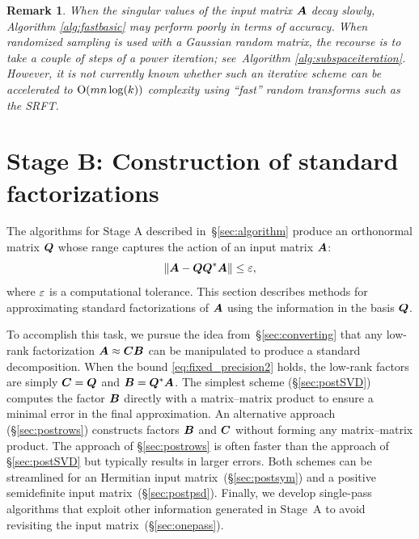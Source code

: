 \documentclass[final]{siamltex}
\newcounter{algorithm}[section]
\newtheorem{remark}{Remark}[section]
\begin{document}
\lsp

\begin{remark} \rm
When the singular values of the input matrix $\bm{A}$ decay slowly,
Algorithm \ref{alg:fastbasic} may perform poorly in terms of accuracy.
When randomized sampling is used with a Gaussian random matrix, the
recourse is to take a couple of steps of a power iteration;
see~Algorithm \ref{alg:subspaceiteration}. However, it is not currently
known whether such an iterative scheme can be accelerated to $\mathrm{O}(mn\log(k))$
complexity using ``fast'' random transforms such as the SRFT.
\end{remark}

\lsp

\section{Stage B: Construction of standard factorizations}
\label{sec:otherfactorizations}

The algorithms for Stage A described in~\S\ref{sec:algorithm} produce an
orthonormal matrix $\bm{Q}$ whose range captures the action of an input
matrix $\bm{A}$:
\begin{equation}
\label{eq:fixed_precision2}
%
\norm{\mtx{A} - \mtx{Q}\mtx{Q}^{\adj}\mtx{A}} \leq \eps,
%
\end{equation}
where $\varepsilon$ is a computational tolerance.  This section describes
methods for approximating standard factorizations of $\bm{A}$ using
the information in the basis $\bm{Q}$.

To accomplish this task, we pursue the idea from~\S\ref{sec:converting}
that any low-rank factorization $\bm{A} \approx \bm{CB}$ can be manipulated
to produce a standard decomposition.  When the bound \eqref{eq:fixed_precision2}
holds, the low-rank factors are simply $\bm{C} = \bm{Q}$ and $\bm{B} = \bm{Q}^* \bm{A}$.
The simplest scheme (\S\ref{sec:postSVD}) computes the factor $\bm{B}$ directly
with a matrix--matrix product to ensure a minimal error in the final approximation.
An alternative approach (\S\ref{sec:postrows}) constructs factors $\bm{B}$ and $\bm{C}$
without forming any matrix--matrix product. The approach of \S\ref{sec:postrows} is often
faster than the approach of \S\ref{sec:postSVD} but typically results in larger errors.
Both schemes can be streamlined for an Hermitian input matrix~(\S\ref{sec:postsym})
and a positive semidefinite input matrix~(\S\ref{sec:postpsd}).
Finally, we develop single-pass algorithms that exploit other information
generated in Stage~A to avoid revisiting the input matrix~(\S\ref{sec:onepass}).
\end{document}
